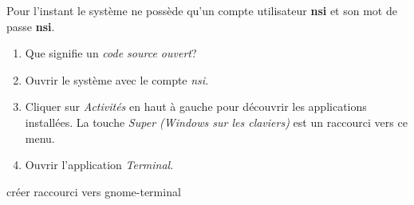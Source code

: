 \documentclass[a4paper,11pt]{article}
\begin{document}
Pour l'instant le système ne possède qu'un compte utilisateur \textbf{nsi} et son mot de passe \textbf{nsi}.
\begin{activite}
    \begin{enumerate}
        \item Que signifie un \emph{code source ouvert}?
        \item Ouvrir le système avec le compte \emph{nsi}.
        \item Cliquer sur \emph{Activités} en haut à gauche pour découvrir les applications installées. La touche \emph{Super (Windows sur les claviers)} est un raccourci vers ce menu.
        \item Ouvrir l'application \emph{Terminal}.
    \end{enumerate}
\end{activite}
\begin{commentprof}
créer raccourci vers gnome-terminal
\end{commentprof}
\end{document}
